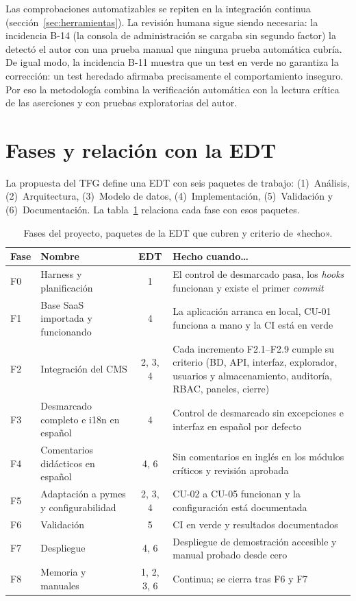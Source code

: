 Las comprobaciones automatizables se repiten en la integración continua
(sección~\ref{sec:herramientas}). La revisión humana sigue siendo necesaria:
la incidencia B-14 (la consola de administración se cargaba sin segundo
factor) la detectó el autor con una prueba manual que ninguna prueba
automática cubría. De igual modo, la incidencia B-11 muestra que un test en
verde no garantiza la corrección: un test heredado afirmaba precisamente el
comportamiento inseguro. Por eso la metodología combina la verificación
automática con la lectura crítica de las aserciones y con pruebas
exploratorias del autor.

\section{Fases y relación con la EDT}
\label{sec:fases}

La propuesta del TFG define una EDT con seis paquetes de trabajo:
(1)~Análisis, (2)~Arquitectura, (3)~Modelo de datos, (4)~Implementación,
(5)~Validación y (6)~Documentación. La tabla~\ref{tab:fases} relaciona cada
fase con esos paquetes.

\begin{table}[htbp]
  \centering
  \small
  \caption{Fases del proyecto, paquetes de la EDT que cubren y criterio de «hecho».}
  \label{tab:fases}
  \begin{tabularx}{\textwidth}{@{}l>{\raggedright\arraybackslash}p{3.4cm}cX@{}}
    \toprule
    \textbf{Fase} & \textbf{Nombre} & \textbf{EDT} & \textbf{Hecho cuando\ldots} \\
    \midrule
    F0 & Harness y planificación & 1 & El control de desmarcado pasa, los \textit{hooks} funcionan y existe el primer \textit{commit} \\
    F1 & Base SaaS importada y funcionando & 4 & La aplicación arranca en local, CU-01 funciona a mano y la CI está en verde \\
    F2 & Integración del CMS & 2, 3, 4 & Cada incremento F2.1--F2.9 cumple su criterio (BD, API, interfaz, explorador, usuarios y almacenamiento, auditoría, RBAC, paneles, cierre) \\
    F3 & Desmarcado completo e i18n en español & 4 & Control de desmarcado sin excepciones e interfaz en español por defecto \\
    F4 & Comentarios didácticos en español & 4, 6 & Sin comentarios en inglés en los módulos críticos y revisión aprobada \\
    F5 & Adaptación a pymes y configurabilidad & 2, 3, 4 & CU-02 a CU-05 funcionan y la configuración está documentada \\
    F6 & Validación & 5 & CI en verde y resultados documentados \\
    F7 & Despliegue & 4, 6 & Despliegue de demostración accesible y manual probado desde cero \\
    F8 & Memoria y manuales & 1, 2, 3, 6 & Continua; se cierra tras F6 y F7 \\
    \bottomrule
  \end{tabularx}
\end{table}

